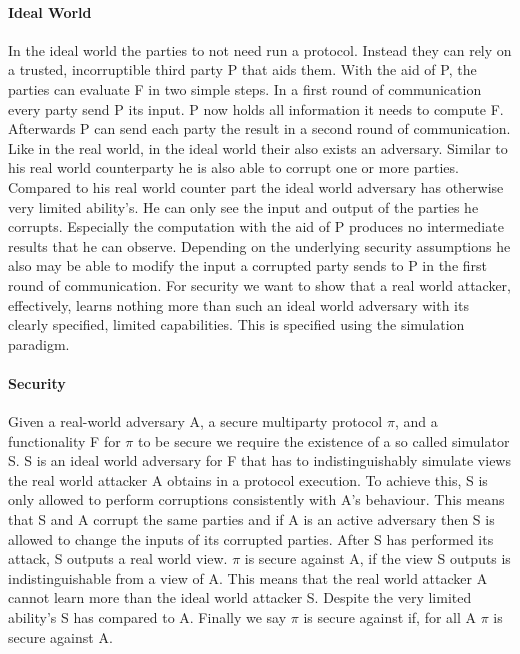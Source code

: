 \paragraph{Ideal World}
In the ideal world the parties to not need run a protocol. Instead they can rely on a trusted, incorruptible third party P that aids them. With the aid of P, the parties can evaluate F in two simple steps. In a first round of communication every party send P its input. P now holds all information it needs to compute F. Afterwards P can send each party the result in a second round of communication. Like in the real world, in the ideal world their also exists an adversary. Similar to his real world counterparty he is also able to corrupt one or more parties. Compared to his real world counter part the ideal world adversary has otherwise very limited ability's. He can only see the input and output of the parties he corrupts. Especially the computation with the aid of P produces no intermediate results that he can observe. Depending on the underlying security assumptions he also may be able to modify the input a corrupted party sends to P in the first round of communication. For security we want to show that a real world attacker, effectively, learns nothing more than such an ideal world adversary with its clearly specified, limited capabilities. This is specified using the simulation paradigm.

\paragraph{Security}
Given a real-world adversary A, a secure multiparty protocol $\pi $, and a functionality F for $\pi $ to be secure we require the existence of a so called simulator S.
S is an ideal world adversary for F that has to indistinguishably simulate views the real world attacker A obtains in a protocol execution. To achieve this, S is only allowed to perform corruptions consistently with A's behaviour. This means that S and A corrupt the same parties and if A is an active adversary then S is allowed to change the inputs of its corrupted parties. After S has performed its attack, S outputs a real world view. $\pi $ is secure against A, if the view S outputs is indistinguishable from a view of A. This means that the real world attacker A cannot learn more than the ideal world attacker S. Despite the very limited ability's S has compared to A. Finally we say $\pi $  is secure against if, for all A $\pi $ is secure against A. 



